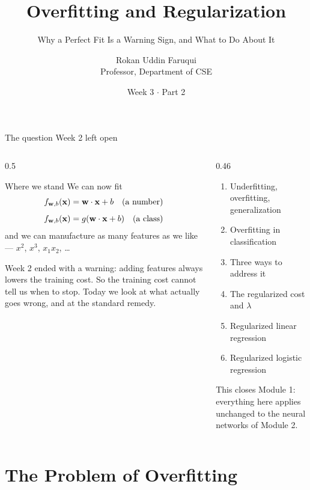 \documentclass[aspectratio=169,10pt]{beamer}
\title[CSE 815 -- Week 3, Part 2]{Overfitting and Regularization}
\subtitle{Why a Perfect Fit Is a Warning Sign, and What to Do About It}
\author{Rokan Uddin Faruqui\\ \small Professor, Department of CSE}
\institute{\small University of Chittagong \\ \texttt{rufaruqui@cu.ac.bd}}
\date[Week 3 / Part 2]{Week 3 $\cdot$ Part 2}
\begin{document}
\begin{frame}
  \titlepage
\end{frame}

\begin{frame}{The question Week 2 left open}
  \begin{columns}[T,onlytextwidth]
    \begin{column}{0.5\textwidth}
      \begin{block}{Where we stand}
        We can now fit
        \[ f_{\mathbf{w},b}(\mathbf{x})=\mathbf{w}\cdot\mathbf{x}+b \quad\text{(a number)} \]
        \[ f_{\mathbf{w},b}(\mathbf{x})=g(\mathbf{w}\cdot\mathbf{x}+b) \quad\text{(a class)} \]
        and we can manufacture as many features as we like --- $x^2$, $x^3$, $x_1x_2$, \dots
      \end{block}
      \footnotesize
      Week 2 ended with a warning: adding features always lowers the training cost. So the
      training cost cannot tell us when to stop. Today we look at what actually goes wrong,
      and at the standard remedy.
    \end{column}
    \begin{column}{0.46\textwidth}
      \begin{keyidea}[Today]
        \footnotesize
        \begin{enumerate}
          \item Underfitting, overfitting, generalization 
          \item Overfitting in classification 
          \item Three ways to address it 
          \item The regularized cost and $\lambda$  
          \item Regularized linear regression  
          \item Regularized logistic regression  
        \end{enumerate}
      \end{keyidea}
      \footnotesize This closes Module 1: everything here applies unchanged to the neural
      networks of Module 2.
    \end{column}
  \end{columns}
\end{frame}

\section{The Problem of Overfitting}
\end{document}
